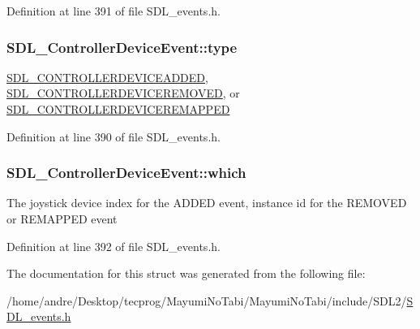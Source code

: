 Definition at line 391 of file S\-D\-L\-\_\-events.\-h.

\hypertarget{struct_s_d_l___controller_device_event_a45b3807eaf70a5f5cf712455da277536}{
\subsubsection[{type}]{ S\-D\-L\-\_\-\-Controller\-Device\-Event\-::type}}\label{struct_s_d_l___controller_device_event_a45b3807eaf70a5f5cf712455da277536}
\hyperlink{_s_d_l__events_8h_a3b589e89be6b35c02e0dd34a55f3fccaa9642de478348da1aba4fb5791e8c5314}{S\-D\-L\-\_\-\-C\-O\-N\-T\-R\-O\-L\-L\-E\-R\-D\-E\-V\-I\-C\-E\-A\-D\-D\-E\-D}, \hyperlink{_s_d_l__events_8h_a3b589e89be6b35c02e0dd34a55f3fccaae00ac6995dfb7b92bfae68b9f47ae07a}{S\-D\-L\-\_\-\-C\-O\-N\-T\-R\-O\-L\-L\-E\-R\-D\-E\-V\-I\-C\-E\-R\-E\-M\-O\-V\-E\-D}, or \hyperlink{_s_d_l__events_8h_a3b589e89be6b35c02e0dd34a55f3fccaaeca87c7b5bb21915d444298449a78ee6}{S\-D\-L\-\_\-\-C\-O\-N\-T\-R\-O\-L\-L\-E\-R\-D\-E\-V\-I\-C\-E\-R\-E\-M\-A\-P\-P\-E\-D} 

Definition at line 390 of file S\-D\-L\-\_\-events.\-h.

\hypertarget{struct_s_d_l___controller_device_event_accb80de1619c1e790cffb6c888c915db}{
\subsubsection[{which}]{ S\-D\-L\-\_\-\-Controller\-Device\-Event\-::which}}\label{struct_s_d_l___controller_device_event_accb80de1619c1e790cffb6c888c915db}
The joystick device index for the A\-D\-D\-E\-D event, instance id for the R\-E\-M\-O\-V\-E\-D or R\-E\-M\-A\-P\-P\-E\-D event 

Definition at line 392 of file S\-D\-L\-\_\-events.\-h.



The documentation for this struct was generated from the following file\-:\begin{DoxyCompactItemize}
\item 
/home/andre/\-Desktop/tecprog/\-Mayumi\-No\-Tabi/\-Mayumi\-No\-Tabi/include/\-S\-D\-L2/\hyperlink{_s_d_l__events_8h}{S\-D\-L\-\_\-events.\-h}\end{DoxyCompactItemize}
